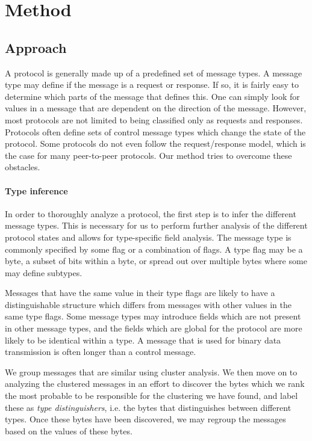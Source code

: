 \documentclass[a4paper]{report}
\begin{document}
\chapter{Method}

\section{Approach}
A protocol is generally made up of a predefined set of message types. A
message type may define if the message is a request or response. If so, it is
fairly easy to determine which parts of the message that defines this. One can
simply look for values in a message that are dependent on the direction of the
message. However, most protocols are not limited to being classified only as
requests and responses. Protocols often define sets of control message types
which change the state of the protocol. Some protocols do not even follow the
request/response model, which is the case for many peer-to-peer protocols. Our
method tries to overcome these obstacles.

\subsubsection{Type inference}
In order to thoroughly analyze a protocol, the first step is to infer the
different message types. This is necessary for us to perform further analysis
of the different protocol states and allows for type-specific field analysis.
The message type is commonly specified by some flag or a combination of flags.
A type flag may be a byte, a subset of bits within a byte, or spread out over
multiple bytes where some may define subtypes.

Messages that have the same value in their type flags are likely to have a
distinguishable structure which differs from messages with other values in the
same type flags. Some message types may introduce fields which are not present
in other message types, and the fields which are global for the protocol are
more likely to be identical within a type. A message that is used for binary
data transmission is often longer than a control message.

We group messages that are similar using cluster analysis. We then move on to
analyzing the clustered messages in an effort to discover the bytes which we
rank the most probable to be responsible for the clustering we have found, and
label these as \emph{type distinguishers}, i.e. the bytes that distinguishes
between different types. Once these bytes have been discovered, we may regroup
the messages based on the values of these bytes.
\end{document}

